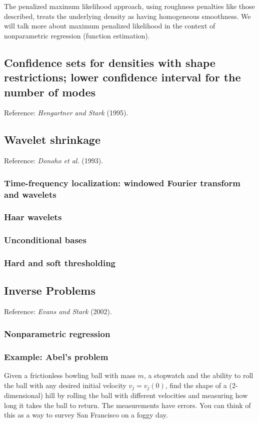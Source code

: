 The penalized maximum likelihood approach, using roughness penalties
like those described, treats the underlying density as having homogeneous
smoothness.
We will talk more about maximum penalized likelihood in the context of
nonparametric regression (function estimation).


\subsection{Confidence sets for densities with shape restrictions; lower confidence interval
for the number of modes}
Reference: {\em Hengartner and Stark\/} (1995).

\subsection{Wavelet shrinkage}
Reference: {\em Donoho et al.\/} (1993).

\subsubsection{Time-frequency localization: windowed Fourier transform and wavelets}

\subsubsection{Haar wavelets}

\subsubsection{Unconditional bases}

\subsubsection{Hard and soft thresholding}

\subsection{Inverse Problems}
Reference: {\em Evans and Stark\/} (2002).

\subsubsection{Nonparametric regression}

\subsubsection{Example: Abel's problem}
Given a frictionless bowling ball with mass $m$, a stopwatch and the ability to roll the
ball with any desired initial velocity $v_j = v_j(0)$, find
the shape of a (2-dimensional)
hill by rolling the ball with different velocities and measuring how long it
takes the ball to return.
The measurements have errors.
You can think of this as a way to survey San Francisco on a foggy day.

